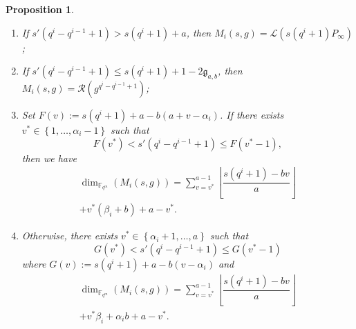 \documentclass[journal]{IEEEtran}
\theoremstyle{plain}
\newtheorem{proposition}[thm]{Proposition}
\theoremstyle{definition}
\theoremstyle{remark}
\newcommand{\calL}{\mathcal{L}}
\newcommand{\calR}{\mathcal{R}}
\newcommand{\fqm}{\mathbb{F}_{q^m}}
\newcommand{\set}[1]{\left\{#1\right\}}
\begin{document}
	\begin{proposition} \label{prop:dim_M_i's}
		\begin{enumerate}
			\item If $s'(q^i-q^{i-1}+1) > s(q^i+1)+a$, then $M_i(s,g) = \calL(s(q^i+1)P_\infty)$;
			
			\item If $s'(q^i-q^{i-1}+1) \leq s(q^i+1)+1-2\mathfrak{g}_{a,b}$, then $M_i(s,g) = \calR(g^{q^{i}-q^{i-1}+1})$;
			
			\item Set $F(v) := s(q^i+1)+a-b(a+v-\alpha_i)$. If there exists $v^* \in \set{1,\dots,\alpha_i-1}$ such that
			$$ F(v^*) < s'(q^i-q^{i-1}+1) \leq  F(v^*-1),$$
			then we have 
			\begin{multline*}
			\dim_{\fqm}(M_i(s,g)) = \sum\limits_{v=v^*}^{a-1} \left\lfloor \dfrac{s(q^i+1)-bv}{a} \right\rfloor\\ + v^*(\beta_i+b) + a-v^*.
			\end{multline*}
			
			\item Otherwise, there exists $v^* \in \set{\alpha_i+1,\dots,a}$ such that
			$$ G(v^*) < s'(q^i-q^{i-1}+1) \leq  G(v^*-1)$$
			where $G(v) := s(q^i+1)+a-b(v-\alpha_i)$ and
			\begin{multline*}
			\dim_{\fqm}(M_i(s,g)) = \sum\limits_{v=v^*}^{a-1} \left\lfloor \dfrac{s(q^i+1)-bv}{a} \right\rfloor\\ + v^*\beta_i + \alpha_ib +a-v^*.
			\end{multline*}				
		\end{enumerate}
	\end{proposition}
	
\end{document}
